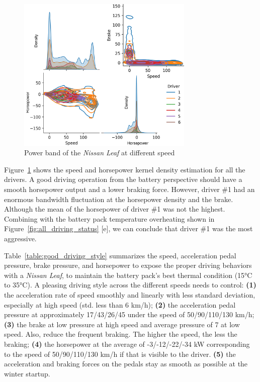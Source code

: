 \begin{figure}[hbt]%
    \begin {center}
    \includegraphics[width=0.75\textwidth]{Chapter5/figures/power_band_density.png}
    \caption{Power band of the \textit{Nissan Leaf} at different speed}
    \label{fig:power_band}
    \end {center}
\end{figure}

Figure~\ref{fig:power_band} shows the speed and horsepower kernel density estimation for all the drivers. 
A good driving operation from the battery perspective should have a smooth horsepower output and a lower braking force. 
However, driver \#1 had an enormous bandwidth fluctuation at the horsepower density and the brake. 
Although the mean of the horsepower of driver \#1 was not the highest. 
Combining with the battery pack temperature overheating shown in Figure~\ref{fig:all_driving_status} [e], we can conclude that driver \#1 was the most aggressive. 

Table~\ref{table:good_driving_style} summarizes the speed, acceleration pedal pressure, brake pressure, and horsepower to expose the proper driving behaviors with a \textit{Nissan Leaf}, to maintain the battery pack's best thermal condition (15°C to 35°C). 
A pleasing driving style across the different speeds needs to control: 
\textbf{(1)} the acceleration rate of speed smoothly and linearly with less standard deviation, especially at high speed (std. less than 6 km/h); 
\textbf{(2)} the acceleration pedal pressure at approximately 17/43/26/45 under the speed of 50/90/110/130 km/h; 
\textbf{(3)} the brake at low pressure at high speed and average pressure of 7 at low speed. 
Also, reduce the frequent braking. The higher the speed, the less the braking; 
\textbf{(4)} the horsepower at the average of -3/-12/-22/-34 kW corresponding to the speed of 50/90/110/130 km/h if that is visible to the driver. 
\textbf{(5)} the acceleration and braking forces on the pedals stay as smooth as possible at the winter startup. 

